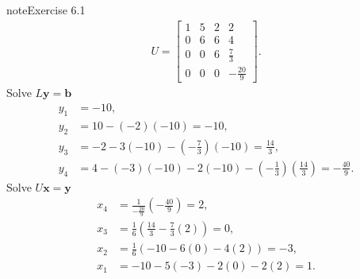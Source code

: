 \documentclass[letterpaper,10pt,english]{jupyterBook}
\begin{document}
\begin{sphinxadmonition}{note}{Exercise 6.1}
\begin{align*}
    U = \left[\begin{matrix}1 & 5 & 2 & 2\\0 & 6 & 6 & 4\\0 & 0 & 6 & \frac{7}{3}\\0 & 0 & 0 & - \frac{20}{9}\end{matrix}\right].
\end{align*}
\sphinxAtStartPar
Solve \(L \mathbf{{y}} = \mathbf{{b}}\)
\begin{align*}
    y_{1} &= -10, \\
    y_{2} &= 10 - \left(-2\right)\left(-10\right) = -10, \\
    y_{3} &= -2 - 3\left(-10\right) - \left(- \frac{7}{3}\right)\left(-10\right) = \frac{14}{3}, \\
    y_{4} &= 4 - \left(-3\right)\left(-10\right) - 2\left(-10\right) - \left(- \frac{1}{3}\right)\left(\frac{14}{3}\right) = - \frac{40}{9}.
\end{align*}
\sphinxAtStartPar
Solve \(U \mathbf{{x}} = \mathbf{{y}}\)
\begin{align*}
    x_{4} &= \frac{1}{- \frac{20}{9}}\left(- \frac{40}{9}\right) = 2, \\
    x_{3} &= \frac{1}{6}\left(\frac{14}{3} - \frac{7}{3}\left(2\right)\right) = 0, \\
    x_{2} &= \frac{1}{6}\left(-10 - 6\left(0\right) - 4\left(2\right)\right) = -3, \\
    x_{1} &= -10 - 5\left(-3\right) - 2\left(0\right) - 2\left(2\right) = 1.
\end{align*}\end{sphinxadmonition}
\end{document}

